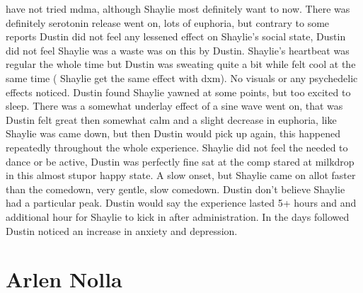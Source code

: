 \documentclass[12pt]{book}
\begin{document}
have not tried mdma, although Shaylie most definitely want to now. There was definitely serotonin release went on, lots of euphoria, but contrary to some reports Dustin did not feel any lessened effect on Shaylie's social state, Dustin did not feel Shaylie was a waste was on this by Dustin. Shaylie's heartbeat was regular the whole time but Dustin was sweating quite a bit while felt cool at the same time ( Shaylie get the same effect with dxm). No visuals or any psychedelic effects noticed. Dustin found Shaylie yawned at some points, but too excited to sleep. There was a somewhat underlay effect of a sine wave went on, that was Dustin felt great then somewhat calm and a slight decrease in euphoria, like Shaylie was came down, but then Dustin would pick up again, this happened repeatedly throughout the whole experience. Shaylie did not feel the needed to dance or be active, Dustin was perfectly fine sat at the comp stared at milkdrop in this almost stupor happy state. A slow onset, but Shaylie came on allot faster than the comedown, very gentle, slow comedown. Dustin don't believe Shaylie had a particular peak. Dustin would say the experience lasted 5+ hours and and additional hour for Shaylie to kick in after administration. In the days followed Dustin noticed an increase in anxiety and depression.



\chapter{Arlen Nolla}
\end{document}

